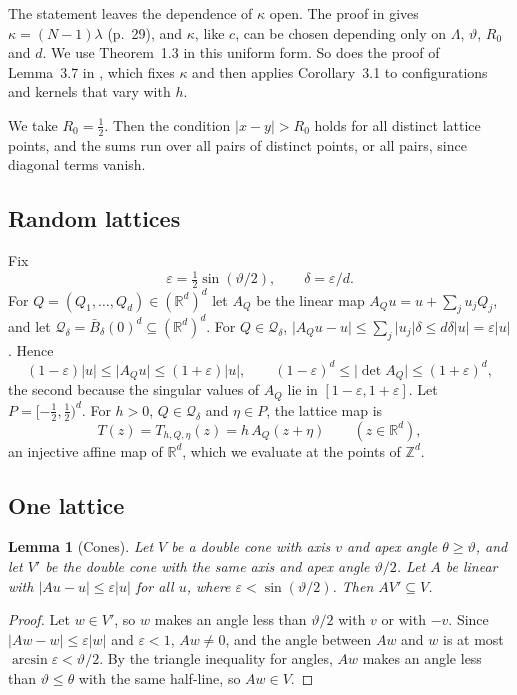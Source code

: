 \documentclass[11pt]{amsart}
\newtheorem{lemma}{Lemma}
\theoremstyle{remark}
\newcommand{\R}{\mathbb{R}}
\newcommand{\Z}{\mathbb{Z}}
\newcommand{\abs}[1]{\lvert #1\rvert}
\newcommand{\norm}[1]{\lvert #1\rvert}
\newcommand{\1}{\mathbf{1}}
\newcommand{\Qd}{\mathcal{Q}_\delta}
\begin{document}
The statement leaves the dependence of $\kappa$ open. The proof in \cite{BKS} gives
$\kappa=(N-1)\lambda$ (p.~29), and $\kappa$, like $c$, can be chosen depending only on $\Lambda$,
$\vartheta$, $R_0$ and $d$. We use Theorem~1.3 in this uniform form. So does the proof of Lemma~3.7
in \cite{BKS}, which fixes $\kappa$ and then applies Corollary~3.1 to configurations and kernels
that vary with $h$.

We take $R_0=\tfrac12$. Then the condition $\abs{x-y}>R_0$ holds for all distinct lattice
points, and the sums run over all pairs of distinct points, or all pairs, since diagonal terms
vanish.

\subsection{Random lattices}

Fix
\[
  \varepsilon=\tfrac12\sin(\vartheta/2),\qquad \delta=\varepsilon/d .
\]
For $Q=(Q_1,\dots,Q_d)\in(\R^d)^d$ let $A_Q$ be the linear map $A_Qu=u+\sum_j u_jQ_j$, and let
$\Qd=\bar B_\delta(0)^d\subseteq(\R^d)^d$. For $Q\in\Qd$,
$\norm{A_Qu-u}\le\sum_j\abs{u_j}\delta\le d\delta\norm{u}=\varepsilon\norm{u}$. Hence
\begin{equation}\label{eq:nearid}
  (1-\varepsilon)\norm{u}\le\norm{A_Qu}\le(1+\varepsilon)\norm{u},\qquad
  (1-\varepsilon)^d\le\abs{\det A_Q}\le(1+\varepsilon)^d,\tag{$\ast$}
\end{equation}
the second because the singular values of $A_Q$ lie in $[1-\varepsilon,1+\varepsilon]$. Let
$P=[-\tfrac12,\tfrac12)^d$. For $h>0$, $Q\in\Qd$ and $\eta\in P$, the lattice map is
\[
  T(z)=T_{h,Q,\eta}(z)=h\,A_Q(z+\eta)\qquad(z\in\R^d),
\]
an injective affine map of $\R^d$, which we evaluate at the points of $\Z^d$.

\subsection{One lattice}

\begin{lemma}[Cones]\label{lem:cone}
Let $V$ be a double cone with axis $v$ and apex angle $\theta\ge\vartheta$, and let $V'$ be the
double cone with the same axis and apex angle $\vartheta/2$. Let $A$ be linear with
$\norm{Au-u}\le\varepsilon\norm{u}$ for all $u$, where $\varepsilon<\sin(\vartheta/2)$. Then
$AV'\subseteq V$.
\end{lemma}

\begin{proof}
Let $w\in V'$, so $w$ makes an angle less than $\vartheta/2$ with $v$ or with $-v$. Since
$\norm{Aw-w}\le\varepsilon\norm{w}$ and $\varepsilon<1$, $Aw\ne0$, and the angle between $Aw$ and
$w$ is at most $\arcsin\varepsilon<\vartheta/2$. By the triangle inequality for angles, $Aw$ makes
an angle less than $\vartheta\le\theta$ with the same half-line, so $Aw\in V$.
\end{proof}
\end{document}
